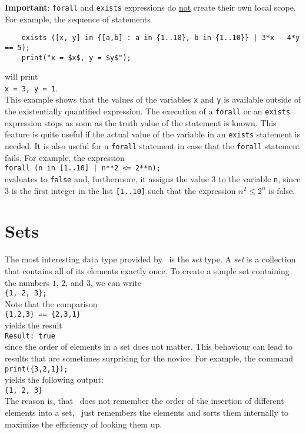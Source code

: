 \noindent
\textbf{Important}:  \texttt{forall} and \texttt{exists} expressions do \underline{not}
create their own local scope.  For example, the sequence of statements
\begin{verbatim}
    exists ([x, y] in {[a,b] : a in {1..10}, b in {1..10}} | 3*x - 4*y == 5);
    print("x = $x$, y = $y$");
\end{verbatim}
will print
\\[0.2cm]
\hspace*{1.3cm}
\texttt{x = 3, y = 1}.
\\[0.2cm]
This example shows that the values of the variables \texttt{x} and \texttt{y} is available
outside of the existentially quantified expression.  The execution of
a \texttt{forall} or an \texttt{exists} expression stops as soon as the
truth value of the statement is known.
This feature is quite useful if the actual value of the variable in an \texttt{exists}
statement is needed.  It is also useful for a \texttt{forall} statement in case that the
\texttt{forall} statement fails.  For example, the expression
\\[0.2cm]
\hspace*{1.3cm}
\texttt{forall (n in [1..10] | n**2 <= 2**n);}
\\[0.2cm]
evaluates to \texttt{false} and, furthermore, it assigns the value $3$ to the variable \texttt{n},
since $3$ is the first integer in the list \texttt{[1..10]}
such that the expression $n^2 \leq 2^n$ is false.

\section{Sets}
The most interesting data type provided by \setlx\ is the \emph{set} type.  A \emph{set} is
a collection that contains all of its elements exactly once.
To create a
simple set containing the numbers $1$, $2$, and $3$, we can write
\\[0.2cm]
\hspace*{1.3cm}
\texttt{\{1, 2, 3\};}
\\[0.2cm]
Note that the comparison
\\[0.2cm]
\hspace*{1.3cm}
\texttt{\{1,2,3\} == \{2,3,1\}}
\\[0.2cm]
yields the result
\\[0.2cm]
\hspace*{1.3cm}
\texttt{Result: true}
\\[0.2cm]
since the order of elements in a set does not matter.  This behaviour can lead to
results that are sometimes surprising for the novice.  For example, the command
\\[0.2cm]
\hspace*{1.3cm}
\texttt{print(\{3,2,1\});}
\\[0.2cm]
yields the following output:
\\[0.2cm]
\hspace*{1.3cm}
\texttt{\{1, 2, 3\}}
\\[0.2cm]
The reason is, that \setlx\ does not remember the order of the insertion of different elements into
a set, \setlx\ just remembers the elements and sorts them internally to maximize the efficiency of
looking them up.

